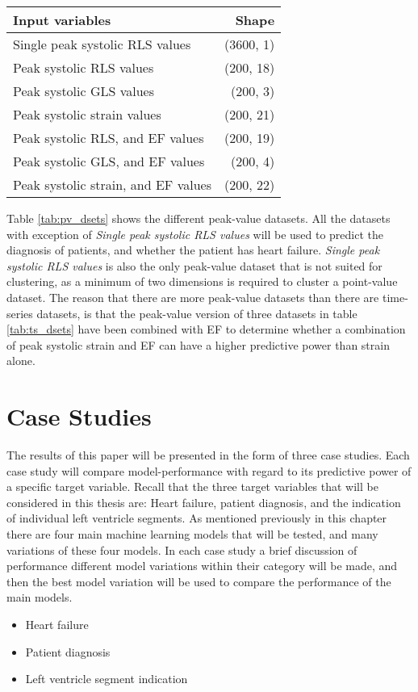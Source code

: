 \begin{table*}[h]
    \centering
    \begin{tabular}{ lr }
        \toprule
        Input variables                     & Shape \\
        \midrule                              
        Single peak systolic RLS values     & (3600, 1) \\
        Peak systolic RLS values            & (200, 18) \\
        Peak systolic GLS values            & (200, 3)  \\
        Peak systolic strain values         & (200, 21) \\
        Peak systolic RLS, and EF values    & (200, 19) \\
        Peak systolic GLS, and EF values    & (200, 4)  \\
        Peak systolic strain, and EF values & (200, 22) \\
        \bottomrule
    \end{tabular}
    \caption{Peak-value datasets. The ''Shape'' parameter is indicates: (Number of objects in the dataset, Number of dimensions of each individual object).}
    \label{tab:pv_dsets}
\end{table*}

Table \ref{tab:pv_dsets} shows the different peak-value datasets. 
All the datasets with exception of \textit{Single peak systolic RLS values} will be used to predict the diagnosis of patients, and whether the patient has heart failure. 
\textit{Single peak systolic RLS values} is also the only peak-value dataset that is not suited for clustering, as a minimum of two dimensions is required to cluster a point-value dataset.
The reason that there are more peak-value datasets than there are time-series datasets, is that the peak-value version of three datasets in table \ref{tab:ts_dsets} have been combined 
with EF to determine whether a combination of peak systolic strain and EF can have a higher predictive power than strain alone.

\section{Case Studies}
The results of this paper will be presented in the form of three case studies. 
Each case study will compare model-performance with regard to its predictive power of a specific target variable. 
Recall that the three target variables that will be considered in this thesis are: Heart failure, patient diagnosis, and the indication of individual left ventricle segments.
As mentioned previously in this chapter there are four main machine learning models that will be tested, and many variations of these four models.
In each case study a brief discussion of performance different model variations within their category will be made, 
and then the best model variation will be used to compare the performance of the main models. 

\begin{itemize}
    \item Heart failure
    \item Patient diagnosis
    \item Left ventricle segment indication
\end{itemize}
